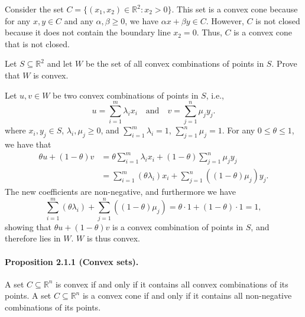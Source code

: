 \begin{solution}
  Consider the set $C = \{ (x_1, x_2) \in \mathbb{R}^2 : x_2 > 0 \}$.
  This set is a convex cone because for any $x, y \in C$ and any $\alpha, \beta \geq 0$, we have $\alpha x + \beta y \in C$.
  However, $C$ is not closed because it does not contain the boundary line $x_2 = 0$.
  Thus, $C$ is a convex cone that is not closed.
\end{solution}

\begin{exercise}
  Let $S \subseteq \mathbb{R}^2$ and let $W$ be the set of all convex combinations of points in $S$.
  Prove that $W$ is convex.
\end{exercise}

\begin{solution}
  Let $u, v \in W$ be two convex combinations of points in $S$, i.e.,
  \begin{equation}
    u = \sum_{i=1}^m \lambda_i x_i
    \quad\text{and}\quad
    v = \sum_{j=1}^n \mu_j y_j.
  \end{equation}
  where $x_i, y_j \in S$, $\lambda_i, \mu_j \geq 0$, and $\sum_{i=1}^m \lambda_i = 1$, $\sum_{j=1}^n \mu_j = 1$.
  For any $0 \leq \theta \leq 1$, we have that
  \begin{equation}
    \begin{split}
      \theta u + (1 - \theta) v
      &= \theta \sum_{i=1}^m \lambda_i x_i + (1 - \theta) \sum_{j=1}^n \mu_j y_j \\
      &= \sum_{i=1}^m (\theta \lambda_i) x_i + \sum_{j=1}^n ((1 - \theta) \mu_j) y_j.
    \end{split}
  \end{equation}
  The new coefficients are non-negative, and furthermore we have
  \begin{equation}
    \sum_{i=1}^m (\theta \lambda_i) + \sum_{j=1}^n ((1 - \theta) \mu_j)
    = \theta \cdot 1 + (1 - \theta) \cdot 1
    = 1,
  \end{equation}
  showing that $\theta u + (1 - \theta) v$ is a convex combination of points in $S$, and therefore lies in $W$.
  $W$ is thus convex.
\end{solution}

\paragraph{Proposition 2.1.1 (Convex sets).}
A set $C \subseteq \mathbb{R}^n$ is convex if and only if it contains all convex combinations of its points.
A set $C \subseteq \mathbb{R}^n$ is a convex cone if and only if it contains all non-negative combinations of its points.

